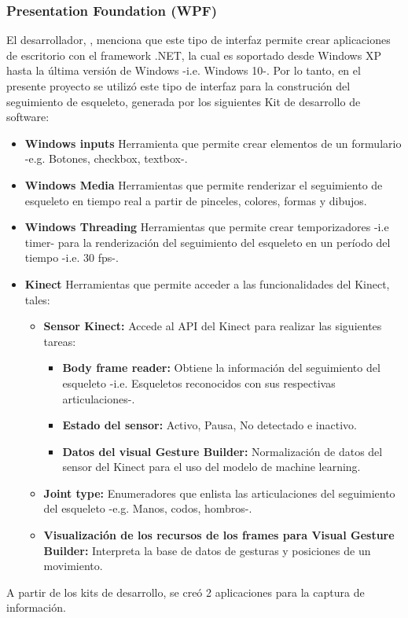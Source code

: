 \subsubsection{Presentation Foundation (WPF)}
\label{ins:UI:wpf}
El desarrollador, , menciona que este tipo de interfaz permite crear aplicaciones de escritorio con el framework .NET, la cual es soportado desde Windows XP hasta la \'ultima versi\'on de Windows -i.e. Windows 10-. Por lo tanto, en el presente proyecto se utiliz\'o este tipo de interfaz para la construci\'on del seguimiento de esqueleto, generada por los siguientes Kit de desarrollo de software:
\begin{itemize}
	\item \textbf{Windows inputs} Herramienta que permite crear elementos de un formulario -e.g. Botones, checkbox, textbox-.
	\item \textbf{Windows Media} Herramientas que permite renderizar el seguimiento de esqueleto en tiempo real a partir de pinceles, colores, formas y dibujos.
	\item \textbf{Windows Threading} Herramientas que permite crear temporizadores -i.e timer- para la renderizaci\'on del seguimiento del esqueleto en un per\'iodo del tiempo -i.e. 30 fps-.
	\item \textbf{Kinect} Herramientas que permite acceder a las funcionalidades del Kinect, tales:
	\begin{itemize}
	\item \textbf{Sensor Kinect:} Accede al API del Kinect para realizar las siguientes tareas:
		\begin{itemize}
				\item \textbf{Body frame reader:} Obtiene la informaci\'on del seguimiento del esqueleto -i.e. Esqueletos reconocidos con sus respectivas articulaciones-.
				\item \textbf{Estado del sensor:} Activo, Pausa, No detectado e inactivo.
				\item \textbf{Datos del visual Gesture Builder:} Normalizaci\'on de datos del sensor del Kinect para el uso del modelo de machine learning.
		\end{itemize}	
			\item \textbf{Joint type:} Enumeradores que enlista las articulaciones del seguimiento del esqueleto -e.g. Manos, codos, hombros-.
			\item \textbf{Visualizaci\'on de los recursos de los frames para Visual Gesture Builder:} Interpreta la base de datos de gesturas y posiciones de un movimiento.
	\end{itemize}	 
\end{itemize}
A partir de los kits de desarrollo, se cre\'o 2 aplicaciones para la captura de informaci\'on.
